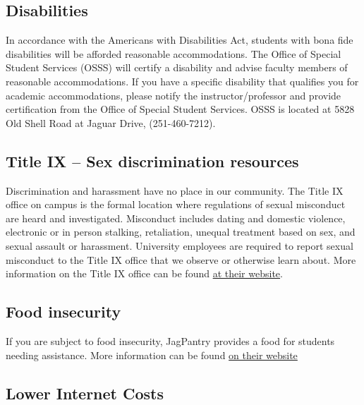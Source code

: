 \documentclass[11pt,]{article}
\begin{document}
\hypertarget{disabilities}{%
\subsection{Disabilities}\label{disabilities}}

In accordance with the Americans with Disabilities Act, students with
bona fide disabilities will be afforded reasonable accommodations. The
Office of Special Student Services (OSSS) will certify a disability and
advise faculty members of reasonable accommodations. If you have a
specific disability that qualifies you for academic accommodations,
please notify the instructor/professor and provide certification from
the Office of Special Student Services. OSSS is located at 5828 Old
Shell Road at Jaguar Drive, (251-460-7212).

\hypertarget{title-ix-sex-discrimination-resources}{%
\subsection{Title IX -- Sex discrimination
resources}\label{title-ix-sex-discrimination-resources}}

Discrimination and harassment have no place in our community. The Title
IX office on campus is the formal location where regulations of sexual
misconduct are heard and investigated. Misconduct includes dating and
domestic violence, electronic or in person stalking, retaliation,
unequal treatment based on sex, and sexual assault or harassment.
University employees are required to report sexual misconduct to the
Title IX office that we observe or otherwise learn about. More
information on the Title IX office can be found
\href{https://www.southalabama.edu/departments/studentaffairs/titlenine/}{at
their website}.

\hypertarget{food-insecurity}{%
\subsection{Food insecurity}\label{food-insecurity}}

If you are subject to food insecurity, JagPantry provides a food for
students needing assistance. More information can be found
\href{https://www.southalabama.edu/departments/sga/foodpantry.html}{on
their website}

\hypertarget{lower-internet-costs}{%
\subsection{Lower Internet Costs}\label{lower-internet-costs}}
\end{document}
